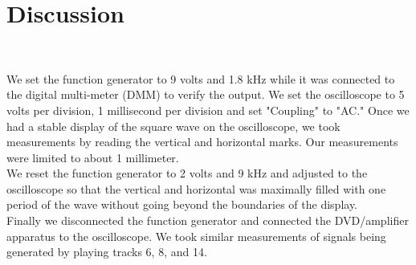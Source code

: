 \documentclass{article}
\begin{document}
\section{Discussion}\hfill\\
\begin{samepage}
	We set the function generator to 9 volts and 1.8 kHz while it was connected to the digital multi-meter (DMM) to verify the output. We set the oscilloscope to 5 volts per division, 1 millisecond per division and set "Coupling" to "AC."  Once we had a stable display of the square wave on the oscilloscope, we took measurements by reading the vertical and horizontal marks.  Our measurements were limited to about 1 millimeter.  \\
	We reset the function generator to  2 volts and 9 kHz and adjusted to the oscilloscope so that the vertical and horizontal was maximally filled with one period of the wave without going beyond the boundaries of the display.  \\
	Finally we disconnected the function generator and connected the DVD/amplifier apparatus to the oscilloscope.  We took similar measurements of signals being generated by playing tracks 6, 8, and 14. \\
\end{samepage}
\end{document}
